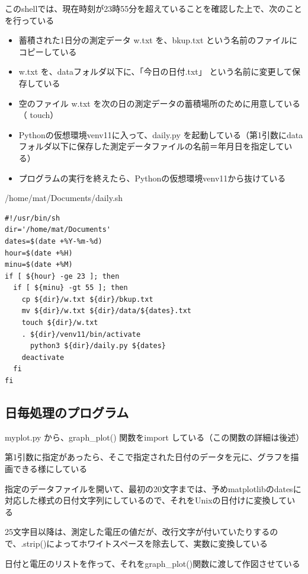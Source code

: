 \documentclass[12pt,a4paper,uplatex]{jsbook}
\begin{document}
このshellでは、現在時刻が23時55分を超えていることを確認した上で、次のことを行っている
\begin{itemize}
	\item 蓄積された1日分の測定データ w.txt を、bkup.txt という名前のファイルにコピーしている
	\item w.txt を、dataフォルダ以下に、「今日の日付.txt」 という名前に変更して保存している
	\item 空のファイル w.txt を次の日の測定データの蓄積場所のために用意している（ touch）
	\item Pythonの仮想環境venv11に入って、daily.py を起動している（第1引数にdataフォルダ以下に保存した測定データファイルの名前＝年月日を指定している）
	\item プログラムの実行を終えたら、Pythonの仮想環境venv11から抜けている
\end{itemize}

\begin{itembox}[l]{/home/mat/Documents/daily.sh}
	\begin{verbatim}
#!/usr/bin/sh
dir='/home/mat/Documents'
dates=$(date +%Y-%m-%d)
hour=$(date +%H)
minu=$(date +%M)
if [ ${hour} -ge 23 ]; then
  if [ ${minu} -gt 55 ]; then
    cp ${dir}/w.txt ${dir}/bkup.txt
    mv ${dir}/w.txt ${dir}/data/${dates}.txt
    touch ${dir}/w.txt
    . ${dir}/venv11/bin/activate
      python3 ${dir}/daily.py ${dates}
    deactivate
  fi
fi
	\end{verbatim}
\end{itembox}


\subsection{日毎処理のプログラム}

	myplot.py から、graph\_plot() 関数をimport している（この関数の詳細は後述）
	
	第1引数に指定があったら、そこで指定された日付のデータを元に、グラフを描画できる様にしている
	
	指定のデータファイルを開いて、最初の20文字までは、予めmatplotlibのdatesに対応した様式の日付文字列にしているので、それをUnixの日付けに変換している
	
	25文字目以降は、測定した電圧の値だが、改行文字が付いていたりするので、.strip()によってホワイトスペースを除去して、実数に変換している
	
	日付と電圧のリストを作って、それをgraph\_plot()関数に渡して作図させている
\end{document}
